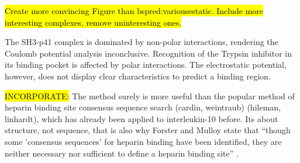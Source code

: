 \hl{Create more convincing Figure than bspred:variousestatic.
Include more interesting complexes, remove uninteresting ones.}

The SH3-p41 complex is dominated by non-polar interactions, rendering the
Coulomb potential analysis inconclusive. Recognition of the Trypsin inhibitor in
its  binding pocket is affected by polar interactions. The electrostatic
potential, however, does not display clear characteristics to predict a binding
region.








\hl{INCORPORATE:} The method surely is more useful than the popular method of
heparin binding site consensus sequence search (cardin, weintraub) (hileman,
linhardt), which has already been applied to interleukin-10 before. Its about
structure, not sequence, that is also why Forster and Mulloy state that
\enquote{though some 'consensus sequences' for heparin binding have been
identified, they are neither necessary nor sufficient to define a heparin
binding site} \cite{hp_binding_sites_mulloy_2006}.
